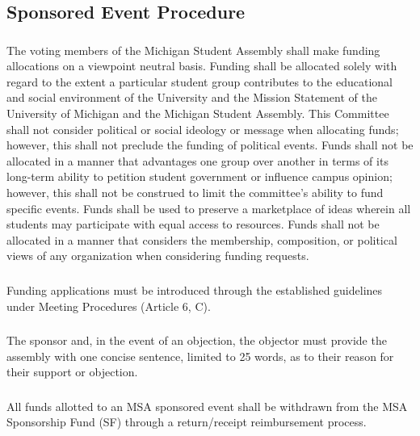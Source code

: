 \subsection{Sponsored Event Procedure}
\subsubsection{}
The voting members of the Michigan Student Assembly shall make funding allocations on a viewpoint neutral basis. 
\subsubsubsection{}
Funding shall be allocated solely with regard to the extent a particular student group contributes to the educational and social environment of the University and the Mission Statement of the University of Michigan and the Michigan Student Assembly. 
\subsubsubsection{}
This Committee shall not consider political or social ideology or message when allocating funds; however, this shall not preclude the funding of political events.
\subsubsubsection{}
Funds shall not be allocated in a manner that advantages one group over another in terms of its long-term ability to petition student government or influence campus opinion; however, this shall not be construed to limit the committee's ability to fund specific events.
\subsubsubsection{}
Funds shall be used to preserve a marketplace of ideas wherein all students may participate with equal access to resources.
\subsubsubsection{}
Funds shall not be allocated in a manner that considers the membership, composition, or political views of any organization when considering funding requests. 

\subsubsection{}
Funding applications must be introduced through the established guidelines under Meeting Procedures (Article 6, C).

\subsubsection{}
The sponsor and, in the event of an objection, the objector must provide the assembly with one concise sentence, limited to 25 words, as to their reason for their support or objection. 

\subsubsection{}
All funds allotted to an MSA sponsored event shall be withdrawn from the MSA Sponsorship Fund (SF) through a return/receipt reimbursement process.

